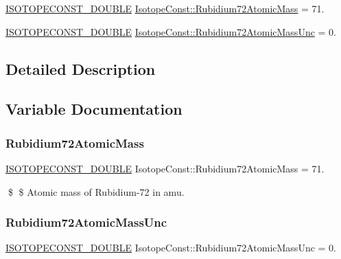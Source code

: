 \begin{DoxyCompactItemize}
\item 
\mbox{\hyperlink{group___isotope_const-_macros_ga8f45a7272ce02c0b4c65c44636ed719a}{I\+S\+O\+T\+O\+P\+E\+C\+O\+N\+S\+T\+\_\+\+D\+O\+U\+B\+LE}} \mbox{\hyperlink{group___isotope_const-_rubidium-_rb72_gaf7c2495a163a4a984a356adbc8aefcff}{Isotope\+Const\+::\+Rubidium72\+Atomic\+Mass}} = 71.
\item 
\mbox{\hyperlink{group___isotope_const-_macros_ga8f45a7272ce02c0b4c65c44636ed719a}{I\+S\+O\+T\+O\+P\+E\+C\+O\+N\+S\+T\+\_\+\+D\+O\+U\+B\+LE}} \mbox{\hyperlink{group___isotope_const-_rubidium-_rb72_gad73fecc16b6fae5d65bb0c1a94b9305d}{Isotope\+Const\+::\+Rubidium72\+Atomic\+Mass\+Unc}} = 0.
\end{DoxyCompactItemize}


\subsection{Detailed Description}


\subsection{Variable Documentation}
\mbox{\label{group___isotope_const-_rubidium-_rb72_gaf7c2495a163a4a984a356adbc8aefcff}} 
\subsubsection{\texorpdfstring{Rubidium72\+Atomic\+Mass}{Rubidium72AtomicMass}}
{\footnotesize\ttfamily \mbox{\hyperlink{group___isotope_const-_macros_ga8f45a7272ce02c0b4c65c44636ed719a}{I\+S\+O\+T\+O\+P\+E\+C\+O\+N\+S\+T\+\_\+\+D\+O\+U\+B\+LE}} Isotope\+Const\+::\+Rubidium72\+Atomic\+Mass = 71.}

\$ \$ Atomic mass of Rubidium-\/72 in amu. \mbox{\label{group___isotope_const-_rubidium-_rb72_gad73fecc16b6fae5d65bb0c1a94b9305d}} 
\subsubsection{\texorpdfstring{Rubidium72\+Atomic\+Mass\+Unc}{Rubidium72AtomicMassUnc}}
{\footnotesize\ttfamily \mbox{\hyperlink{group___isotope_const-_macros_ga8f45a7272ce02c0b4c65c44636ed719a}{I\+S\+O\+T\+O\+P\+E\+C\+O\+N\+S\+T\+\_\+\+D\+O\+U\+B\+LE}} Isotope\+Const\+::\+Rubidium72\+Atomic\+Mass\+Unc = 0.}

